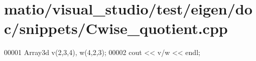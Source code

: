\hypertarget{matio_2visual__studio_2test_2eigen_2doc_2snippets_2_cwise__quotient_8cpp_source}{}\section{matio/visual\+\_\+studio/test/eigen/doc/snippets/\+Cwise\+\_\+quotient.cpp}
\label{matio_2visual__studio_2test_2eigen_2doc_2snippets_2_cwise__quotient_8cpp_source}

\begin{DoxyCode}
00001 Array3d v(2,3,4), w(4,2,3);
00002 cout << v/w << endl;
\end{DoxyCode}
